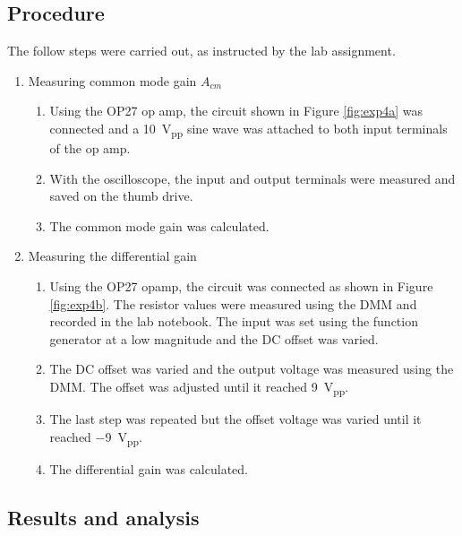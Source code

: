 \documentclass{report}
\newcommand{\pp}{_{pp}}
\newcommand{\Vpp}{\V\pp}
\begin{document}
\subsection{Procedure}
The follow steps were carried out, as instructed by the lab assignment.
\begin{enumerate}
	\item Measuring common mode gain $A_{cm}$
		\begin{enumerate}
			\item Using the OP27 op amp, the circuit shown in Figure \ref{fig:exp4a} was connected and a \SI{10}{\Vpp} sine wave was attached to both input terminals of the op amp.
			\item With the oscilloscope, the input and output terminals were measured and saved on the thumb drive.
			\item The common mode gain was calculated.
		\end{enumerate}
	\item Measuring the differential gain
		\begin{enumerate}
			\item Using the OP27 opamp, the circuit was connected as shown in Figure \ref{fig:exp4b}. The resistor values were measured using the DMM and recorded in the lab notebook. The input was set using the function generator at a low magnitude and the DC offset was varied.
			\item The DC offset was varied and the output voltage was measured using the DMM. The offset was adjusted until it reached \SI{9}{\Vpp}.
			\item The last step was repeated but the offset voltage was varied until it reached \SI{-9}{\Vpp}.
			\item The differential gain was calculated.
		\end{enumerate}
\end{enumerate}

\subsection{Results and analysis}
\end{document}
